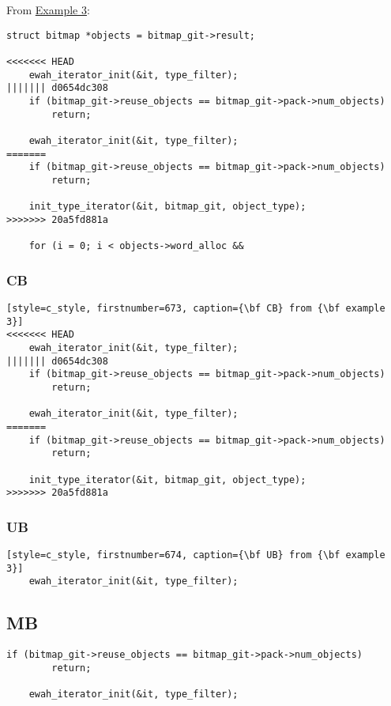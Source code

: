 From \hyperref[example_03]{Example 3}:
\begin{lstlisting}[style=c_style, firstnumber=671, caption=Conflict from {\bf example 3}]
	struct bitmap *objects = bitmap_git->result;

<<<<<<< HEAD
	ewah_iterator_init(&it, type_filter);
||||||| d0654dc308
	if (bitmap_git->reuse_objects == bitmap_git->pack->num_objects)
		return;

	ewah_iterator_init(&it, type_filter);
=======
	if (bitmap_git->reuse_objects == bitmap_git->pack->num_objects)
		return;

	init_type_iterator(&it, bitmap_git, object_type);
>>>>>>> 20a5fd881a

	for (i = 0; i < objects->word_alloc &&
\end{lstlisting}

\subsubsection*{CB}
\begin{lstlisting}[style=c_style, firstnumber=673, caption={\bf CB} from {\bf example 3}]
<<<<<<< HEAD
	ewah_iterator_init(&it, type_filter);
||||||| d0654dc308
	if (bitmap_git->reuse_objects == bitmap_git->pack->num_objects)
		return;

	ewah_iterator_init(&it, type_filter);
=======
	if (bitmap_git->reuse_objects == bitmap_git->pack->num_objects)
		return;

	init_type_iterator(&it, bitmap_git, object_type);
>>>>>>> 20a5fd881a
\end{lstlisting}

\subsubsection*{UB}
\begin{lstlisting}[style=c_style, firstnumber=674, caption={\bf UB} from {\bf example 3}]
	ewah_iterator_init(&it, type_filter);
\end{lstlisting}

\subsection*{MB}
\begin{lstlisting}[style=c_style, firstnumber=676, caption=One {\bf MB} from {\bf example 3}]
	if (bitmap_git->reuse_objects == bitmap_git->pack->num_objects)
		return;

	ewah_iterator_init(&it, type_filter);
\end{lstlisting}

